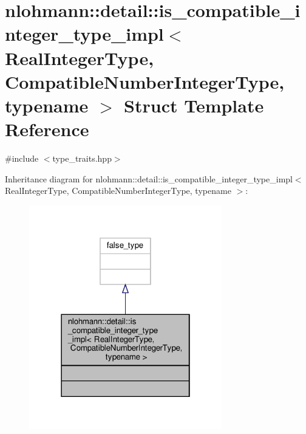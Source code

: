 \hypertarget{structnlohmann_1_1detail_1_1is__compatible__integer__type__impl}{}\section{nlohmann\+:\+:detail\+:\+:is\+\_\+compatible\+\_\+integer\+\_\+type\+\_\+impl$<$ Real\+Integer\+Type, Compatible\+Number\+Integer\+Type, typename $>$ Struct Template Reference}
\label{structnlohmann_1_1detail_1_1is__compatible__integer__type__impl}


{\ttfamily \#include $<$type\+\_\+traits.\+hpp$>$}



Inheritance diagram for nlohmann\+:\+:detail\+:\+:is\+\_\+compatible\+\_\+integer\+\_\+type\+\_\+impl$<$ Real\+Integer\+Type, Compatible\+Number\+Integer\+Type, typename $>$\+:
\nopagebreak
\begin{figure}[H]
\begin{center}
\leavevmode
\includegraphics[width=238pt]{structnlohmann_1_1detail_1_1is__compatible__integer__type__impl__inherit__graph}
\end{center}
\end{figure}


